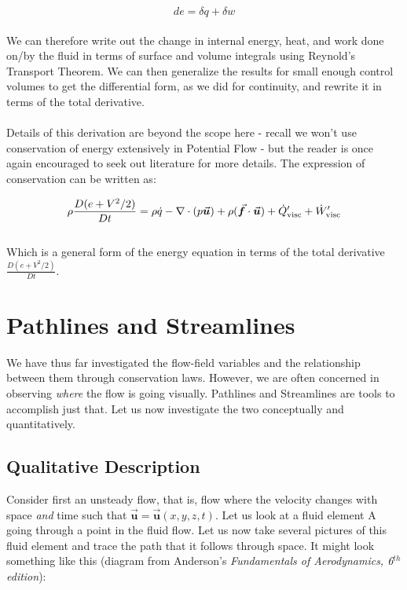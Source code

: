 \documentclass[11pt]{article}
\begin{document}
\begin{equation*}
    de = \delta q + \delta w
\end{equation*}\\
\noindent
We can therefore write out the change in internal energy, heat, and work done on/by the fluid in terms of surface and volume integrals using Reynold's Transport Theorem. We can then generalize the results for small enough control volumes to get the differential form, as we did for continuity, and rewrite it in terms of the total derivative.\\ \\
\noindent
Details of this derivation are beyond the scope here - recall we won't use conservation of energy extensively in Potential Flow - but the reader is once again encouraged to seek out literature for more details. The expression of conservation can be written as:

\begin{equation}\label{energy}
    \rho \frac{D(e+V^2/2)}{Dt} = \rho \dot{q} - \nabla \cdot (p \vec{\bm{u}}) + \rho (\vec{\bm{f}} \cdot \vec{\bm{u}}) + \dot{Q}_\textnormal{visc}' + \dot{W}_\textnormal{visc}'
\end{equation}\\
Which is a general form of the energy equation in terms of the total derivative $\frac{D(e+V^2/2)}{Dt}$.
\pagebreak

\section{Pathlines and Streamlines}
We have thus far investigated the flow-field variables and the relationship between them through conservation laws. However, we are often concerned in observing \emph{where} the flow is going visually. Pathlines and Streamlines are tools to accomplish just that. Let us now investigate the two conceptually and quantitatively.

\subsection{Qualitative Description}
Consider first an unsteady flow, that is, flow where the velocity changes with space \emph{and} time such that $\vec{\bm{u}} = \vec{\bm{u}}(x, y, z, t)$. Let us look at a fluid element A going through a point in the fluid flow. Let us now take several pictures of this fluid element and trace the path that it follows through space. It might look something like this (diagram from Anderson's \emph{Fundamentals of Aerodynamics, 6$^{th}$ edition}): \\ \\
\end{document}
